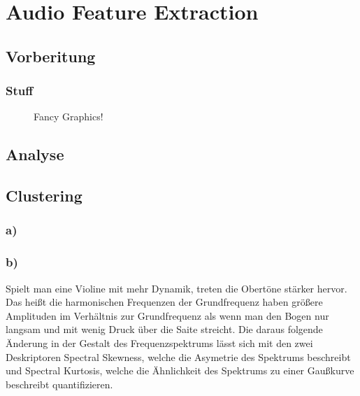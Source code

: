 \chapter{Audio Feature Extraction}


\section{Vorberitung}
\label{sec:preperation}

\subsection{Stuff}
\begin{figure}[H]
    \center
    \caption{Fancy Graphics!}
    \label{fig:im}
\end{figure}




\section{Analyse}
\label{sec:analyse}




\section{Clustering}
\label{sec:cluster}
\subsection{a)}
\subsection{b)}
Spielt man eine Violine mit mehr Dynamik, treten die Obertöne stärker hervor.
Das heißt die harmonischen Frequenzen der Grundfrequenz haben größere Amplituden im Verhältnis zur Grundfrequenz als wenn man den Bogen nur langsam und mit wenig Druck über die Saite streicht.  
Die daraus folgende Änderung in der Gestalt des Frequenzspektrums lässt sich mit den zwei Deskriptoren Spectral Skewness, welche die Asymetrie des Spektrums beschreibt und Spectral Kurtosis, welche die Ähnlichkeit des Spektrums zu einer Gaußkurve beschreibt quantifizieren. 
 